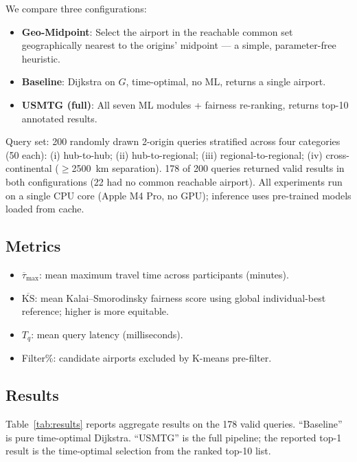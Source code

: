 \documentclass[review]{elsarticle}
\begin{document}
We compare three configurations:
\begin{itemize}
    \item \textbf{Geo-Midpoint}: Select the airport in the reachable common set geographically nearest to the origins' midpoint --- a simple, parameter-free heuristic.
    \item \textbf{Baseline}: Dijkstra on $G$, time-optimal, no ML, returns a single airport.
    \item \textbf{USMTG (full)}: All seven ML modules + fairness re-ranking, returns top-10 annotated results.
\end{itemize}

Query set: 200 randomly drawn 2-origin queries stratified across four categories (50 each): (i) hub-to-hub; (ii) hub-to-regional; (iii) regional-to-regional; (iv) cross-continental ($\geq$2500~km separation).
178 of 200 queries returned valid results in both configurations (22 had no common reachable airport).
All experiments run on a single CPU core (Apple M4 Pro, no GPU); inference uses pre-trained models loaded from cache.

\subsection{Metrics}

\begin{itemize}
    \item $\overline{\tau}_{\max}$: mean maximum travel time across participants (minutes).
    \item $\overline{\text{KS}}$: mean Kalai--Smorodinsky fairness score using global individual-best reference; higher is more equitable.
    \item $T_{q}$: mean query latency (milliseconds).
    \item Filter\%: candidate airports excluded by K-means pre-filter.
\end{itemize}

\subsection{Results}

Table~\ref{tab:results} reports aggregate results on the 178 valid queries.
``Baseline'' is pure time-optimal Dijkstra.
``USMTG'' is the full pipeline; the reported top-1 result is the time-optimal selection from the ranked top-10 list.
\end{document}
